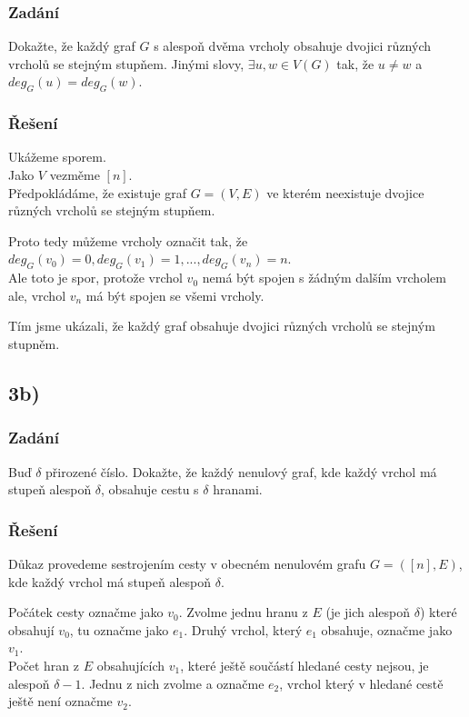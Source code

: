 \documentclass[../main.tex]{subfiles}
\begin{document}
\subsubsection*{Zadání}
Dokažte, že každý graf $G$ s alespoň dvěma vrcholy obsahuje dvojici různých vrcholů se stejným stupňem. Jinými slovy, $\exists u,w \in V(G)$
tak, že $u\neq w$ a $deg_G(u) = deg_G(w)$.
\subsubsection*{Řešení}

Ukážeme sporem. \\
Jako $V$ vezměme $[n]$.\\
Předpokládáme, že existuje graf $G = (V,E)$ ve kterém neexistuje dvojice různých vrcholů se stejným stupňem.

Proto tedy můžeme vrcholy označit tak, že $deg_G(v_0) = 0, deg_G(v_1) = 1, ..., deg_G(v_n)=n$.\\
Ale toto je spor, protože vrchol $v_0$ nemá být spojen s žádným dalším vrcholem ale, vrchol $v_n$ má být spojen se všemi vrcholy.

Tím jsme ukázali, že každý graf obsahuje dvojici různých vrcholů se stejným stupněm. 


\subsection*{3b)}
\subsubsection*{Zadání}
Buď $\delta$ přirozené číslo. Dokažte, že každý nenulový graf, kde každý vrchol má stupeň alespoň $\delta$, obsahuje cestu s $\delta$ hranami.
\subsubsection*{Řešení}

Důkaz provedeme sestrojením cesty v obecném nenulovém grafu $G=([n], E)$, kde každý vrchol má stupeň alespoň $\delta$.


Počátek cesty označme jako $v_0$. 
Zvolme jednu hranu z $E$ (je jich alespoň $\delta$) které obsahují $v_0$, tu označme jako $e_1$.
Druhý vrchol, který $e_1$ obsahuje, označme jako $v_1$.\\
Počet hran z $E$ obsahujících $v_1$, které ještě součástí hledané cesty nejsou, je alespoň $\delta-1$.
Jednu z nich zvolme a označme $e_2$, vrchol který v hledané cestě ještě není označme $v_2$.
\end{document}
